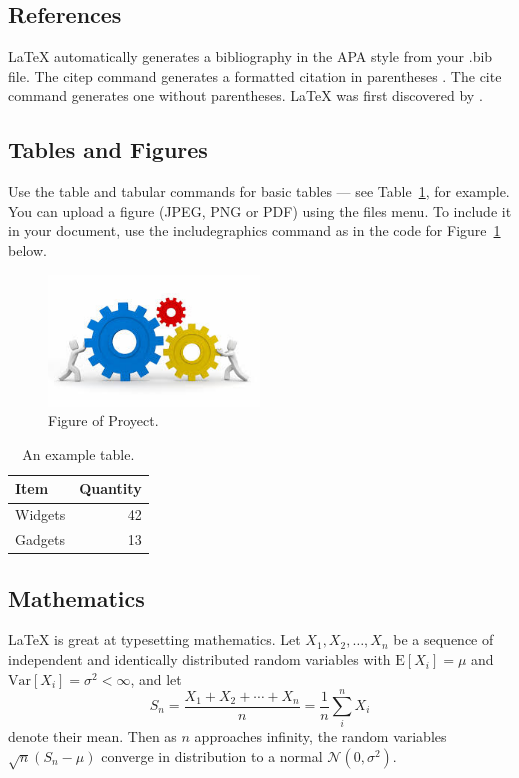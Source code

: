 \documentclass[a4paper,man,natbib]{apa6}
\begin{document}
\subsection{References}

LaTeX automatically generates a bibliography in the APA style from your .bib file. The citep command generates a formatted citation in parentheses \citep{Lamport1986}. The cite command generates one without parentheses. LaTeX was first discovered by \cite{Lamport1986}.

\subsection{Tables and Figures}

Use the table and tabular commands for basic tables --- see Table~\ref{tab:widgets}, for example. You can upload a figure (JPEG, PNG or PDF) using the files menu. To include it in your document, use the includegraphics command as in the code for Figure~\ref{fig:frog} below.

\begin{figure}
\centering
\includegraphics[width=0.5\textwidth]{Proyecto.jpg}
\caption{\label{fig:frog}Figure of Proyect.}
\end{figure}

\begin{table}
\centering
\begin{tabular}{l|r}
Item & Quantity \\\hline
Widgets & 42 \\
Gadgets & 13
\end{tabular}
\caption{\label{tab:widgets}An example table.}
\end{table}

\subsection{Mathematics}

\LaTeX{} is great at typesetting mathematics. Let $X_1, X_2, \ldots, X_n$ be a sequence of independent and identically distributed random variables with $\text{E}[X_i] = \mu$ and $\text{Var}[X_i] = \sigma^2 < \infty$, and let
$$S_n = \frac{X_1 + X_2 + \cdots + X_n}{n}
      = \frac{1}{n}\sum_{i}^{n} X_i$$
denote their mean. Then as $n$ approaches infinity, the random variables $\sqrt{n}(S_n - \mu)$ converge in distribution to a normal $\mathcal{N}(0, \sigma^2)$.
\end{document}
